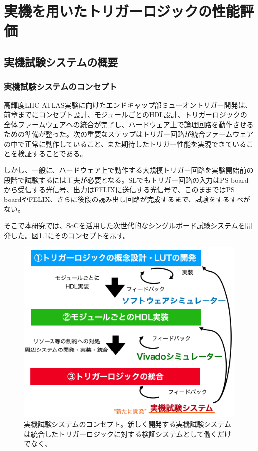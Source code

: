 \chapter{実機を用いたトリガーロジックの性能評価}
\label{chap_TriggerTest}

\section{実機試験システムの概要}
\subsection{実機試験システムのコンセプト}
高輝度LHC-ATLAS実験に向けたエンドキャップ部ミューオントリガー開発は、前章までにコンセプト設計、モジュールごとのHDL設計、トリガーロジックの全体ファームウェアへの統合が完了し、ハードウェア上で論理回路を動作させるための準備が整った。次の重要なステップはトリガー回路が統合ファームウェアの中で正常に動作していること、また期待したトリガー性能を実現できていることを検証することである。

しかし、一般に、ハードウェア上で動作する大規模トリガー回路を実験開始前の段階で試験するには工夫が必要となる。SLでもトリガー回路の入力はPS boardから受信する光信号、出力はFELIXに送信する光信号で、このままではPS boardやFELIX、さらに後段の読み出し回路が完成するまで、試験をするすべがない。

そこで本研究では、SoCを活用した次世代的なシングルボード試験システムを開発した。図\ref{Concept_test}にそのコンセプトを示す。

\begin{figure} 
\centering
\includegraphics[width=16cm]{fig/Test/Concept_test.png}
\caption[実機試験システムのコンセプト]{実機試験システムのコンセプト。新しく開発する実機試験システムは統合したトリガーロジックに対する検証システムとして働くだけでなく、}
\label{Concept_test}
\end{figure}

